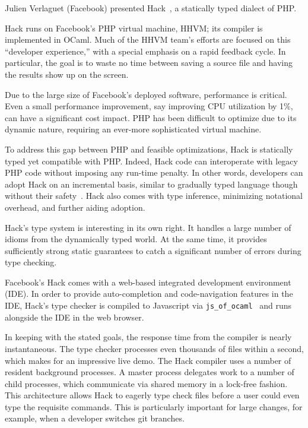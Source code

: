\documentclass{jfp1}
\begin{document}

Julien Verlaguet (Facebook) presented Hack~\cite{Verlaguet:2014:Hack}, a
statically typed dialect of PHP.

Hack runs on Facebook's PHP virtual machine, HHVM; its compiler is
implemented in OCaml. Much of the HHVM team's efforts are focused on
this ``developer experience,'' with a special emphasis on a rapid
feedback cycle. In particular, the goal is to waste no time between
saving a source file and having the results show up on the screen.

Due to the large size of Facebook's deployed software, performance is
critical.  Even a small performance improvement, say improving CPU
utilization by 1\%, can have a significant cost impact. PHP has been
difficult to optimize due to its dynamic nature, requiring an
ever-more sophisticated virtual machine.

To address this gap between PHP and feasible optimizations, Hack is
statically typed yet compatible with PHP. Indeed, Hack code can
interoperate with legacy PHP code without imposing any run-time
penalty. In other words, developers can adopt Hack on an incremental
basis, similar to gradually typed language though without their
safety~\cite{st:gradual06,thf:dls06}. Hack also comes with type
inference, minimizing notational overhead, and further aiding
adoption.

Hack's type system is interesting in its own right. It handles a large
number of idioms from the dynamically typed world. At the same time,
it provides sufficiently strong static guarantees to catch a
significant number of errors during type checking.

Facebook's Hack comes with a web-based integrated development environment
(IDE). In order to provide auto-completion and code-navigation features in
the IDE, Hack's type checker is compiled to Javascript via
\texttt{js\_of\_ocaml}~\cite{DBLP:journals/spe/VouillonB14} and runs
alongside the IDE in the web browser.

In keeping with the stated goals, the response time from the compiler is
nearly instantaneous. The type checker processes even thousands of files
within a second, which makes for an impressive live demo.  The Hack
compiler uses a number of resident background processes. A master process
delegates work to a number of child processes, which communicate via
shared memory in a lock-free fashion. This architecture allows Hack to
eagerly type check files before a user could even type the requisite
commands. This is particularly important for large changes, for example,
when a developer switches git branches.
\end{document}
